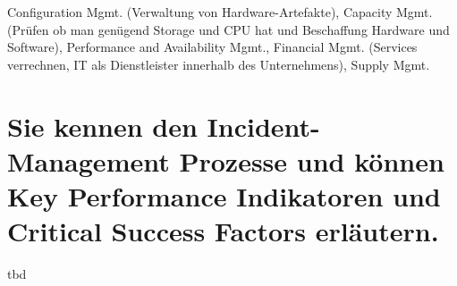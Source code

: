 Configuration Mgmt. (Verwaltung von Hardware-Artefakte), Capacity Mgmt. (Prüfen ob man genügend Storage und CPU hat und Beschaffung Hardware und Software), Performance and Availability Mgmt., Financial Mgmt. (Services verrechnen, IT als Dienstleister innerhalb des Unternehmens), Supply Mgmt.

\section{Sie kennen den Incident-Management Prozesse und
	können Key Performance Indikatoren und Critical Success
	Factors erläutern.}
tbd